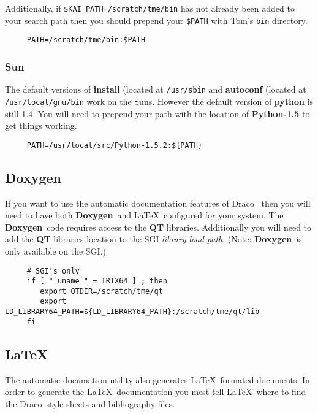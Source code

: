 \documentclass[11pt]{nmemo}
\newcommand{\comp}[1]{\normalfont\normalsize\texttt{#1}}
\newcommand{\draco}{{\normalfont\sffamily Draco}}
\newcommand{\doxygen}{{\normalfont\bfseries Doxygen}}
\begin{document}
Additionally, if \comp{\$KAI\_PATH=/scratch/tme/bin} has not already
been added to your search path then you should prepend your
\comp{\$PATH} with Tom's \comp{bin} directory.

\begin{verbatim}
     PATH=/scratch/tme/bin:$PATH
\end{verbatim} %

\subsubsection{Sun}

The default versions of \textbf{install} (located at \comp{/usr/sbin}
and \textbf{autoconf} (located at \comp{/usr/local/gnu/bin} work on
the Suns.  However the default version of \textbf{python} is still
1.4.  You will need to prepend your path with the location of
\textbf{Python-1.5} to get things working.

\begin{verbatim}
     PATH=/usr/local/src/Python-1.5.2:${PATH}
\end{verbatim} %

\subsection{Doxygen}
\label{doxygen}

If you want to use the automatic documentation features of
\draco~\cite{doxygen} then you will need to have both \doxygen\ and
\LaTeX\ configured for your system.  The \doxygen\ code requires
access to the \textbf{QT} libraries.  Additionally you will need to
add the \textbf{QT} libraries location to the SGI \emph{library load
  path}. (Note: \doxygen\ is only available on the SGI.)

\begin{verbatim}
     # SGI's only
     if [ "`uname`" = IRIX64 ] ; then
        export QTDIR=/scratch/tme/qt 
        export LD_LIBRARY64_PATH=${LD_LIBRARY64_PATH}:/scratch/tme/qt/lib
     fi
\end{verbatim} %

\subsection{\LaTeX}

The automatic documation utility also generates \LaTeX\ formated
documents.  In order to generate the \LaTeX\ documentation you mest
tell \LaTeX\ where to find the \draco\ style sheets and bibliography
files. 
\end{document}
